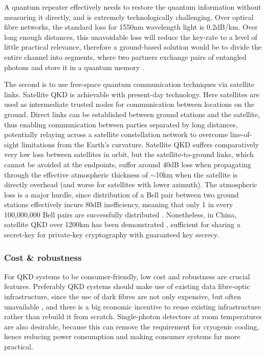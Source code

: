 A quantum repeater effectively needs to restore the quantum information without measuring it directly, and is extremely technologically challenging. Over optical fibre networks, the standard loss for 1550nm wavelength light is 0.2dB/km. Over long enough distances, this unavoidable loss will reduce the key-rate to a level of little practical relevance, therefore a ground-based solution would be to divide the entire channel into segments, where two partners exchange pairs of entangled photons and store it in a quantum memory \cite{bib:BDCZ98, bib:dur98}.

The second is to use free-space quantum communication techniques via satellite links. Satellite QKD is achievable with present-day technology. Here satellites are used as intermediate trusted nodes for communication between locations on the ground. Direct links can be established between ground stations and the satellite, thus enabling communication between parties separated by long distances, potentially relaying across a satellite constellation network to overcome line-of-sight limitations from the Earth's curvature. Satellite QKD suffers comparatively very low loss between satellites in orbit, but the satellite-to-ground links, which cannot be avoided at the endpoints, suffer around 40dB loss when propagating through the effective atmospheric thickness of $\sim$10km when the satellite is directly overhead (and worse for satellites with lower azimuth). The atmospheric loss is a major hurdle, since distribution of a Bell pair between two ground stations effectively incurs 80dB inefficiency, meaning that only 1 in every 100,000,000 Bell pairs are successfully distributed . Nonetheless, in China, satellite QKD over 1200km has been demonstrated \cite{bib:liao2017satellite}, sufficient for sharing a secret-key for private-key cryptography with guaranteed key secrecy.

\subsubsection{Cost \& robustness}
 
For QKD systems to be consumer-friendly, low cost and robustness are crucial features. Preferably QKD systems should make use of existing data fibre-optic infrastructure, since the use of dark fibres are not only expensive, but often unavailable \cite{bib:diamanti2016practical}, and there is a big economic incentive to reuse existing infrastructure rather than rebuild it from scratch. Single-photon detectors at room temperatures are also desirable, because this can remove the requirement for cryogenic cooling, hence reducing power consumption and making consumer systems far more practical.

